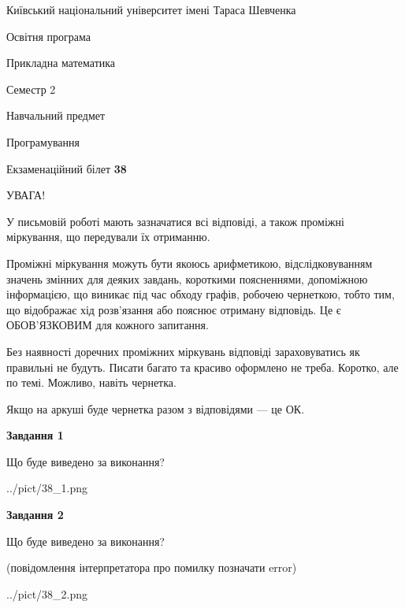 \documentclass[12pt, ukrainian]{article}
\begin{document}
{{\begin {small}\par
{ \center  Київський національний університет імені Тараса Шевченка \par}
{\parbox {5 cm}{Освітня програма \hfill}{\parbox {7 cm}{Прикладна математика\hfill}}\parbox {6 cm}{\hfill Семестр 2}}\par
{\parbox {5 cm} {Навчальний предмет \hfill}\parbox {7 cm}{Програмування \hfill}\parbox {6cm}{\hfill}\par}\vspace{-7pt} \end{small}}{\center Екзаменаційний білет \No \textbf
{ 38 }\par}}
{
\begin {large}
УВАГА!

У письмовій роботі мають зазначатися всі відповіді, а також проміжні міркування, що передували їх отриманню.

Проміжні міркування можуть бути якоюсь арифметикою, відслідковуванням зна\-чень змінних для деяких завдань,
короткими поясненнями, допоміжною інформацією, що виникає під час обходу графів, робочею чернеткою,
тобто тим, що відображає хід розв’язання або пояснює отриману відповідь.
Це є ОБОВ’ЯЗКОВИМ для кожного запитання.

Без наявності доречних проміжних міркувань відповіді зараховуватись як правиль\-ні не будуть.
Писати багато та красиво оформлено не треба. Коротко, але по темі. Можли\-во, навіть чернетка.

Якщо на аркуші буде чернетка разом з відповідями --- це ОК.

\newpage

{\begin {center}\textbf{Завдання 1}\end {center}}\par
Що буде виведено за виконання?\par
\begin{center}
	{../pict/38_1.png}
\end{center}
\newpage

{\begin {center}\textbf{Завдання 2}\end {center}}\par
Що буде виведено за виконання?\par
 (повідомлення інтерпретатора про помилку позначати error)\par
\begin{center}
	{../pict/38_2.png}
\end{center}
\newpage


\end{large}}
\end{document}
